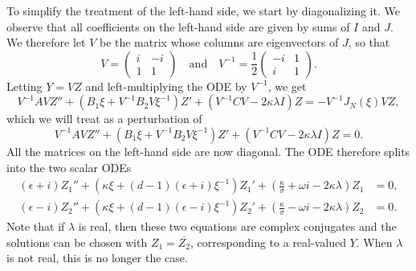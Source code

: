 \documentclass[11pt]{article}
\newcommand{\conj}[1]{\overline{#1}}
\begin{document}
To simplify the treatment of the left-hand side, we start by
diagonalizing it. We observe that all coefficients on the left-hand
side are given by sums of \(I\) and \(J\). We therefore let \(V\) be
the matrix whose columns are eigenvectors of \(J\), so that
\begin{equation*}
  V =
  \begin{pmatrix}
    i & -i \\ 1 & 1
  \end{pmatrix}
  \quad\text{and}\quad
  V^{-1} = \frac{1}{2}
  \begin{pmatrix}
    -i & 1 \\ i & 1
  \end{pmatrix}.
\end{equation*}
Letting \(Y = VZ\) and left-multiplying the ODE by \(V^{-1}\), we get
\begin{equation}\label{eq:Z}
  V^{-1}AVZ'' + (B_{1}\xi + V^{-1}B_{2}V\xi^{-1})Z' + (V^{-1}CV - 2\kappa\lambda I)Z = -V^{-1}J_{N}(\xi)VZ,
\end{equation}
which we will treat as a perturbation of
\begin{equation}\label{eq:Z-homogeneous}
  V^{-1}AVZ'' + (B_{1}\xi + V^{-1}B_{2}V\xi^{-1})Z' + (V^{-1}CV - 2\kappa\lambda I)Z = 0.
\end{equation}
All the matrices on the left-hand side are now diagonal. The ODE
therefore splits into the two scalar ODEs
\begin{align}
  \label{eq:Z-scalar-1}
  (\epsilon + i)Z_{1}'' + (\kappa\xi + (d - 1)(\epsilon + i)\xi^{-1})Z_{1}'
  + \left(\frac{\kappa}{\sigma} + \omega i - 2\kappa\lambda\right)Z_{1} &= 0,\\
  \label{eq:Z-scalar-2}
  (\epsilon - i)Z_{2}'' + (\kappa\xi + (d - 1)(\epsilon - i)\xi^{-1})Z_{2}'
  + \left(\frac{\kappa}{\sigma} - \omega i - 2\kappa\lambda\right)Z_{2} &= 0.
\end{align}
Note that if \(\lambda\) is real, then these two equations are complex
conjugates and the solutions can be chosen with
\(Z_{1} = \conj{Z_{2}}\), corresponding to a real-valued \(Y\). When
\(\lambda\) is not real, this is no longer the case.
\end{document}
